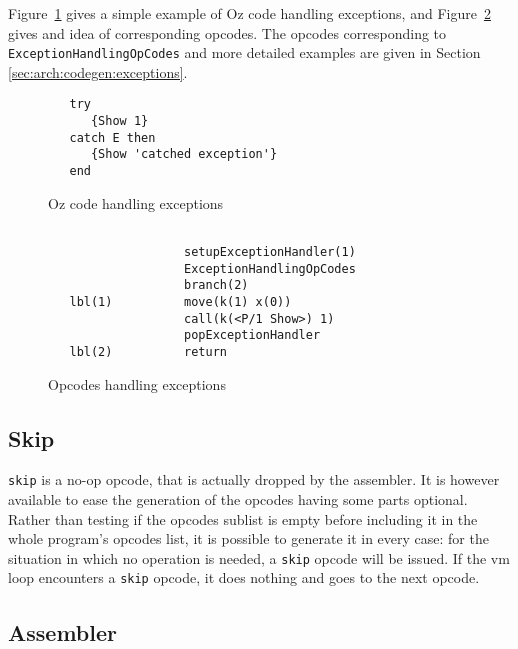\documentclass[a4paper]{memoir}
\begin{document}
Figure~\ref{fig:opcodes:exception:oz} gives a simple example of Oz code
handling exceptions, and Figure~\ref{fig:opcodes:exception:result} gives and
idea of corresponding opcodes. The opcodes corresponding to
\lstinline!ExceptionHandlingOpCodes! and more detailed examples are given in
Section \ref{sec:arch:codegen:exceptions}.
\begin{figure}[ht]
\begin{lstlisting}
   try
      {Show 1}
   catch E then
      {Show 'catched exception'}
   end
\end{lstlisting}
\caption{Oz code handling exceptions}
\label{fig:opcodes:exception:oz}
\end{figure}



\begin{figure}[ht]
\begin{lstlisting}
    
                   setupExceptionHandler(1)
                   ExceptionHandlingOpCodes
                   branch(2)
   lbl(1)          move(k(1) x(0))
                   call(k(<P/1 Show>) 1)
                   popExceptionHandler
   lbl(2)          return
\end{lstlisting}
\caption{Opcodes handling exceptions}
\label{fig:opcodes:exception:result}
\end{figure}


\subsection{Skip}
\lstinline!skip! is a no-op opcode, that is actually dropped by the assembler.
It is however available to ease the generation of the opcodes having some parts
optional. Rather than testing if the opcodes sublist is empty before including
it in the whole program's opcodes list, it is possible to generate it in every
case: for the situation in which no operation is needed, a \lstinline!skip! opcode will be
issued.
If the vm loop encounters a \lstinline!skip! opcode, it does nothing and goes to the next opcode.

\subsection{Assembler}
\end{document}
